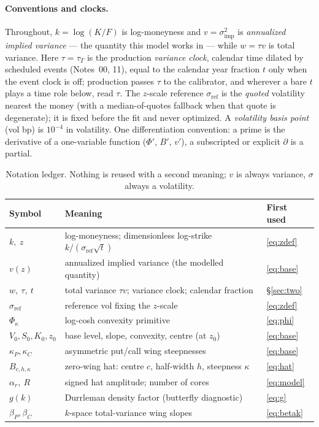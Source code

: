\documentclass[11pt]{article}
\newcommand{\vref}{\sigma_{\mathrm{ref}}}
\newcommand{\Phik}{\Phi_\kappa}
\newcommand{\betP}{\beta_P}
\newcommand{\betC}{\beta_C}
\begin{document}
\paragraph{Conventions and clocks.}
Throughout, $k=\log(K/F)$ is log-moneyness and $v=\sigma_{\mathrm{imp}}^2$ is
\emph{annualized implied variance} --- the quantity this model works in ---
while $w=\tau v$ is total variance.  Here $\tau=\tau_T$ is the production
\emph{variance clock}, calendar time dilated by scheduled events (Notes~00,
11), equal to the calendar year fraction $t$ only when the event clock is off;
production passes $\tau$ to the calibrator, and wherever a bare $t$ plays a time
role below, read $\tau$.  The $z$-scale reference $\vref$ is the \emph{quoted}
volatility nearest the money (with a median-of-quotes fallback when that quote
is degenerate); it is fixed before the fit and never optimized.  A
\emph{volatility basis point} (vol bp) is $10^{-4}$ in volatility.  One
differentiation convention: a prime is the derivative of a one-variable function
($\Phi'$, $B'$, $v'$), a subscripted or explicit $\partial$ is a partial.

\begin{table}[H]
\centering
\small
\setlength{\tabcolsep}{5pt}
\renewcommand{\arraystretch}{1.16}
\begin{tabular}{@{}lll@{}}
\toprule
Symbol & Meaning & First used\\
\midrule
$k,\ z$ & log-moneyness; dimensionless log-strike $k/(\vref\sqrt t)$ & \eqref{eq:zdef}\\
$v(z)$ & annualized implied variance (the modelled quantity) & \eqref{eq:base}\\
$w,\ \tau,\ t$ & total variance $\tau v$; variance clock; calendar fraction & \S\ref{sec:two}\\
$\vref$ & reference vol fixing the $z$-scale & \eqref{eq:zdef}\\
$\Phik$ & log-cosh convexity primitive & \eqref{eq:phi}\\
$V_0,S_0,K_0,z_0$ & base level, slope, convexity, centre (at $z_0$) & \eqref{eq:base}\\
$\kappa_P,\kappa_C$ & asymmetric put/call wing steepnesses & \eqref{eq:base}\\
$B_{c,h,\kappa}$ & zero-wing hat: centre $c$, half-width $h$, steepness $\kappa$ & \eqref{eq:hat}\\
$\alpha_r,\ R$ & signed hat amplitude; number of cores & \eqref{eq:model}\\
$g(k)$ & Durrleman density factor (butterfly diagnostic) & \eqref{eq:g}\\
$\betP,\betC$ & $k$-space total-variance wing slopes & \eqref{eq:betak}\\
\bottomrule
\end{tabular}
\caption{Notation ledger.  Nothing is reused with a second meaning; $v$ is
always variance, $\sigma$ always a volatility.}
\label{tab:ledger}
\end{table}
\end{document}
